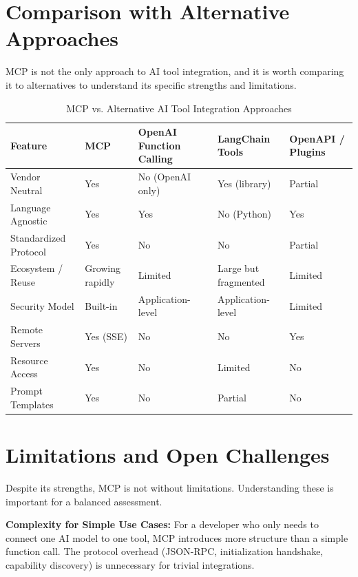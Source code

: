 \section{Comparison with Alternative Approaches}
MCP is not the only approach to AI tool integration, and it is worth comparing it to alternatives to understand its specific strengths and limitations.

\begin{table}[H]
    \centering
    \caption{MCP vs. Alternative AI Tool Integration Approaches}
    \label{tab:mcp_comparison}
    \begin{tabular}{|>{\raggedright\arraybackslash}p{2.5cm}|>{\raggedright\arraybackslash}p{2.5cm}|>{\raggedright\arraybackslash}p{2.5cm}|>{\raggedright\arraybackslash}p{2.5cm}|>{\raggedright\arraybackslash}p{2.5cm}|}
        \hline
        \textbf{Feature} & \textbf{MCP} & \textbf{OpenAI Function Calling} & \textbf{LangChain Tools} & \textbf{OpenAPI / Plugins} \\ \hline
        Vendor Neutral & Yes & No (OpenAI only) & Yes (library) & Partial \\ \hline
        Language Agnostic & Yes & Yes & No (Python) & Yes \\ \hline
        Standardized Protocol & Yes & No & No & Partial \\ \hline
        Ecosystem / Reuse & Growing rapidly & Limited & Large but fragmented & Limited \\ \hline
        Security Model & Built-in & Application-level & Application-level & Limited \\ \hline
        Remote Servers & Yes (SSE) & No & No & Yes \\ \hline
        Resource Access & Yes & No & Limited & No \\ \hline
        Prompt Templates & Yes & No & Partial & No \\ \hline
    \end{tabular}
\end{table}

\section{Limitations and Open Challenges}
Despite its strengths, MCP is not without limitations. Understanding these is important for a balanced assessment.

\textbf{Complexity for Simple Use Cases:} For a developer who only needs to connect one AI model to one tool, MCP introduces more structure than a simple function call. The protocol overhead (JSON-RPC, initialization handshake, capability discovery) is unnecessary for trivial integrations.

